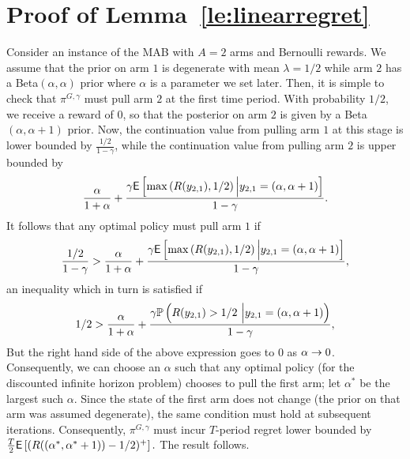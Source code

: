 \appendix
\section{Proof of Lemma~\ref{le:linearregret}} \label{proof:linearregret}
\begin{myproof}[Proof.]
	Consider an instance of the MAB with $A=2$ arms and Bernoulli rewards. We assume that the prior on arm $1$ is degenerate with mean $\lambda = 1/2$ while arm $2$ has a {\rm Beta}$(\alpha,\alpha)$ prior where $\alpha$ is a parameter we set later. Then, it is simple to check that $\pi^{G,\gamma}$ must pull arm $2$ at the first time period. With probability $1/2$, we receive a reward of $0$, so that the posterior on arm $2$ is given by a {\rm Beta}$(\alpha,\alpha+1)$ prior. Now, the continuation value from pulling arm $1$ at this stage is lower bounded by $\frac{1/2}{1-\gamma}$, while the continuation value from pulling arm $2$ is upper bounded by
	\[
	\frac{\alpha}{1+\alpha}
	+
	\frac{
		\gamma
		\E
		\left[
		\max\left(
		R(y_{2,1}),1/2
		\right)
		\Big| y_{2,1} = \left(\alpha, \alpha+1 \right)
		\right]
	}
	{
		1-\gamma
	}.
	\]
	It follows that any optimal policy must pull arm $1$ if
	\[
	\frac{1/2}{1-\gamma}
	>
	\frac{\alpha}{1+\alpha}
	+
	\frac{
		\gamma
		\E
		\left[
		\max\left(
		R(y_{2,1}),1/2
		\right)
		\Big| y_{2,1} = \left(\alpha, \alpha+1 \right)
		\right]
	}
	{
		1-\gamma
	},
	\]
	an inequality which in turn is satisfied if
	\[
	1/2
	>
	\frac{\alpha}{1+\alpha}
	+
	\frac{
		\gamma
		\P{
			R(y_{2,1})>1/2 \
			\Big| y_{2,1} = \left(\alpha, \alpha+1 \right)
		}
	}
	{
		1-\gamma
	},
	\]
	But the right hand side of the above expression goes to $0$ as $\alpha \tends 0$. Consequently, we can choose an $\alpha$ such that any optimal policy (for the discounted infinite horizon problem) chooses to pull the first arm; let $\alpha^*$ be the largest such $\alpha$. Since the state of the first arm does not change (the prior on that arm was assumed degenerate), the same condition must hold at subsequent iterations. Consequently, $\pi^{G,\gamma}$ must incur $T$-period regret lower bounded by 
	$\frac{T}{2}
	\E
	\left[
	(
	R((\alpha^*,\alpha^*+1)) - 1/2
	)^+
	\right].
	$
	The result follows. 
\end{myproof}
